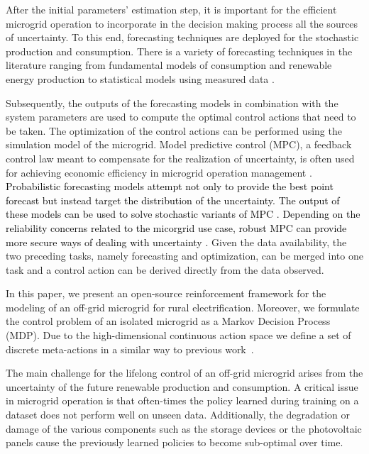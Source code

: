 \documentclass{article}
\begin{document}
	After the initial parameters' estimation step, it is important for the efficient microgrid operation to incorporate in the decision making process all the sources of uncertainty. To this end, forecasting techniques are deployed for the stochastic production and consumption. There is a variety of forecasting techniques in the literature ranging from fundamental models of consumption and renewable energy production \cite{Dolara2015} to statistical models using measured data \cite{Lombardi2019}. 

	Subsequently, the outputs of the forecasting models in combination with the system parameters are used to compute the optimal control actions that need to be taken. The optimization of the control actions can be performed using the simulation model of the microgrid. Model predictive control (MPC), a feedback control law meant to compensate for the realization of uncertainty, is often used for achieving economic efficiency in microgrid operation management \cite{Parisio2014}. \textcolor{black}{Probabilistic forecasting models attempt not only to provide the best point forecast but instead target the distribution of the uncertainty. The output of these models can be used to solve stochastic variants of MPC \cite{BRUNI2016119}. Depending on the reliability concerns related to the micorgrid use case, robust MPC can provide more secure ways of dealing with uncertainty \cite{ZHANG20181229}.} Given the data availability, the two preceding tasks, namely forecasting and optimization, can be merged into one task and a control action can be derived directly from the data observed. 
    
    
	In this paper, we present an open-source reinforcement framework for the modeling of an off-grid microgrid for rural electrification. Moreover, we formulate the control problem of an isolated microgrid as a Markov Decision Process (MDP). Due to the high-dimensional continuous action space we define a set of discrete meta-actions in a similar way to previous work~\cite{Boukas2018}.

	The main challenge for the lifelong control of an off-grid microgrid arises from the uncertainty of the future renewable production and consumption. A critical issue in microgrid operation is that often-times the policy learned during training on a dataset does not perform well on unseen data. Additionally, the degradation or damage of the various components such as the storage devices or the photovoltaic panels cause the previously learned policies to become sub-optimal over time.
\end{document}
